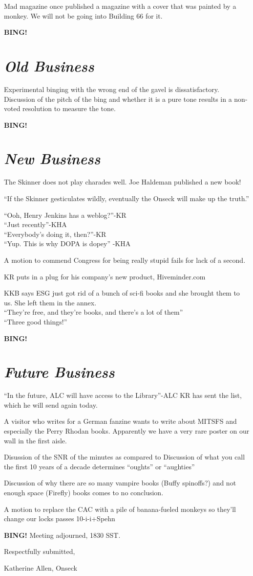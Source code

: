 \documentclass[10pt]{article}
\newcommand{\bing}{{\bf BING!} }
\newcommand{\goto}[1]{\bing \vskip 12pt \section*{{\em{#1}}}}
\begin{document}
Mad magazine once published a magazine with a cover that was painted
by a monkey.  We will not be going into Building 66 for it.


\goto{Old Business}
Experimental binging with the wrong end of the gavel is
dissatisfactory.  Discussion of the pitch of the bing and whether it
is a pure tone results in a non-voted resolution to measure the tone.

\goto{New Business}
The Skinner does not play charades well.
Joe Haldeman published a new book!

``If the Skinner gesticulates wildly, eventually the Onseck will make
up the truth.'' 

``Ooh, Henry Jenkins has a weblog?''-KR\\
``Just recently''-KHA\\
``Everybody's doing it, then?''-KR\\
``Yup. This is why DOPA is dopey'' -KHA

A motion to commend Congress for being really stupid fails for lack of
a second.

KR puts in a plug for his company's new product, Hiveminder.com

KKB says ESG just got rid of a bunch of sci-fi books and she brought them
to us.  She left them in the annex.  \\
``They're free, and they're books, and there's a lot of them''\\
``Three good things!''

\goto{Future Business}

``In the future, ALC will have access to the Library''-ALC
KR has sent the list, which he will send again today.

A visitor who writes for a German fanzine wants to write about MITSFS
and especially the Perry Rhodan books. Apparently we have a very rare
poster on our wall in the first aisle. 

Disussion of the SNR of the minutes as compared to 
Discussion of what you call the first 10 years of a decade determines
``oughts'' or ``aughties''

Discussion of why there are so many vampire books (Buffy spinoffs?)
and not enough space (Firefly) books comes to no conclusion.

A motion to replace the CAC with a pile of banana-fueled monkeys so
they'll change our locks passes 10-i-i+Spehn

\bing
\noindent
Meeting adjourned, 1830 SST.

\vspace{18pt}

\centerline{Respectfully submitted,}
\centerline{Katherine Allen, Onseck}
\end{document}

